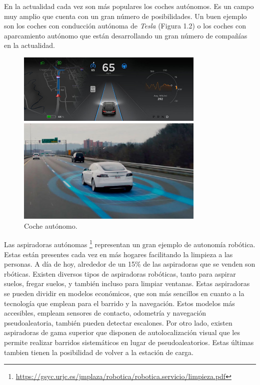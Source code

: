 \documentclass[a4paper, 12pt]{book}
\begin{document}
En la actualidad cada vez son más populares los coches autónomos. Es un campo muy amplio que cuenta con un gran número de posibilidades. Un buen ejemplo son los coches con conducción autónoma de \textit{Tesla}  (Figura 1.2) o los coches con aparcamiento autónomo que están desarrollando un gran número de compañías en la actualidad.

\begin{figure}[H]
  \centering
  \begin{minipage}[b]{\textwidth}
  	\centering
    \includegraphics[width=0.8\textwidth]{img/coche}
  \end{minipage}
  \hfill
  \begin{minipage}[b]{\textwidth}
    \centering
    \includegraphics[width=0.8\textwidth]{img/tesla.jpg}
  \end{minipage}
  \caption{Coche autónomo.}
\end{figure}

Las aspiradoras autónomas \footnote{\url{https://gsyc.urjc.es/jmplaza/robotica/robotica.servicio/limpieza.pdf}} representan un gran ejemplo de autonomía robótica. Estas están presentes cada vez en más hogares facilitando la limpieza a las personas. A día de hoy, alrededor de un 15\% de las aspiradoras que se venden son rbóticas. Existen diversos tipos de aspiradoras robóticas, tanto para aspirar suelos, fregar suelos, y también incluso para limpiar ventanas. Estas aspiradoras se pueden dividir en modelos económicos, que son más sencillos en cuanto a la tecnología que emplean para el barrido y la navegación. Estos modelos más accesibles, empleam sensores de contacto, odometría y navegación pseudoaleatoria, también pueden detectar escalones. Por otro lado, existen aspiradoras de gama superior que disponen de autolocalización visual que les permite realizar barridos sistemáticos en lugar de pseudoaleatorios. Estas últimas tambien tienen la posibilidad de volver a la estación de carga.
\end{document}
